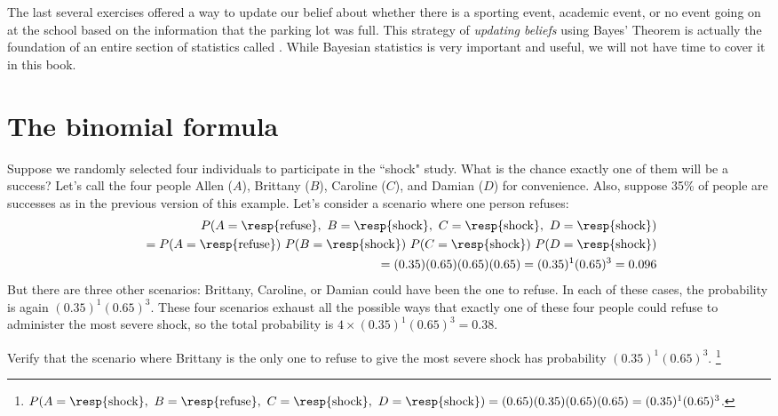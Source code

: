 The last several exercises offered a way to update our belief about whether there is a sporting event, academic event, or no event going on at the school based on the information that the parking lot was full. This strategy of \emph{updating beliefs} using Bayes' Theorem is actually the foundation of an entire section of statistics called . While Bayesian statistics is very important and useful, we will not have time to cover it in this book.





\section{The binomial formula}

\begin{example}{Suppose we randomly selected four individuals to participate in the ``shock" study. What is the chance exactly one of them will be a success?  Let's call the four people Allen ($A$), Brittany ($B$), Caroline ($C$), and Damian ($D$) for convenience. Also, suppose 35\% of people are successes as in the previous version of this example.}\label{oneRefuser}
Let's consider a scenario where one person refuses:
\begin{eqnarray*}
&&P(A=\text{\resp{refuse}},\text{ }B=\text{\resp{shock}},\text{ }C=\text{\resp{shock}},\text{ }D=\text{\resp{shock}}) \\
 &&\quad =  P(A=\text{\resp{refuse}})\ P(B=\text{\resp{shock}})\ P(C=\text{\resp{shock}})\ P(D=\text{\resp{shock}}) \\
 &&\quad =  (0.35)  (0.65)  (0.65)  (0.65) = (0.35)^1 (0.65)^3 = 0.096
\end{eqnarray*}
But there are three other scenarios: Brittany, Caroline, or Damian could have been the one to refuse. In each of these cases, the probability is again $(0.35)^1(0.65)^3$. These four scenarios exhaust all the possible ways that exactly one of these four people could refuse to administer the most severe shock, so the total probability is $4\times(0.35)^1(0.65)^3 = 0.38$.
\end{example}

\begin{exercise}
Verify that the scenario where Brittany is the only one to refuse to give the most severe shock has probability $(0.35)^1(0.65)^3$. \footnote{$P(A=\text{\resp{shock}},\text{ }B=\text{\resp{refuse}},\text{ }C=\text{\resp{shock}},\text{ }D=\text{\resp{shock}}) = (0.65)(0.35)(0.65)(0.65) = (0.35)^1(0.65)^3$.}
\end{exercise}


